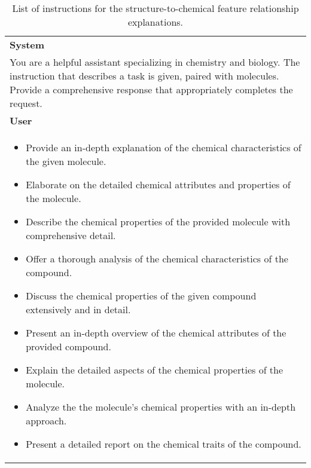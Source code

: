 
\begin{table*}[ht!]
\centering  
\footnotesize
\begin{tcolorbox}[enhanced,breakable,
    colframe=gray!50!white,
    colbacktitle=white,
    coltitle=black,
    colback=white,
    borderline={0.5mm}{0mm}{gray!15!white},
    borderline={0.5mm}{0mm}{gray!50!white,dashed},
    attach boxed title to top center={yshift=-2mm},
    boxed title style={boxrule=0.8pt}]
    \renewcommand{\arraystretch}{1.1}
    \begin{tabular}{p{.95\linewidth}}
        \textbf{System}\\
        You are a helpful assistant specializing in chemistry and biology. The instruction that describes a task is given, paired with molecules. Provide a comprehensive response that appropriately completes the request. \\
        \midrule
        \textbf{User}\\
        \vspace{-0.1in}
        \begin{itemize}[topsep=-5mm, itemsep=1pt, parsep=0pt, leftmargin=*]    
            \item Provide an in-depth explanation of the chemical characteristics of the given molecule.
            \item Elaborate on the detailed chemical attributes and properties of the molecule.
            \item Describe the chemical properties of the provided molecule with comprehensive detail.
            \item Offer a thorough analysis of the chemical characteristics of the compound.
            \item Discuss the chemical properties of the given compound extensively and in detail.
            \item Present an in-depth overview of the chemical attributes of the provided compound.
            \item Explain the detailed aspects of the chemical properties of the molecule.
            \item Analyze the the molecule's chemical properties with an in-depth approach.
            \item Present a detailed report on the chemical traits of the compound.
        \end{itemize}
        \vspace{-0.3in}
    \end{tabular}
\end{tcolorbox}
\vspace{-0.15in}
\caption{List of instructions for the structure-to-chemical feature relationship explanations.}
\label{app:tab:instructions_chemical}
\end{table*}
